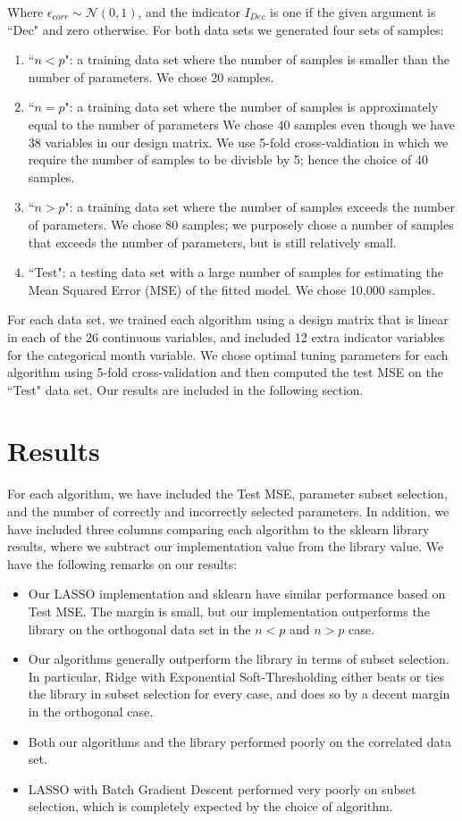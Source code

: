 \documentclass[11pt]{article}
\begin{document}
Where $\epsilon_{corr} \sim \mathcal{N}(0,1)$, and the indicator $I_{Dec}$ is one if the given argument is ``Dec" and zero otherwise.  For both data sets we generated four sets of samples:
\begin{enumerate}
	\item ``$n<p$": a training data set where the number of samples is smaller than the number of parameters.  We chose 20 samples.  
	\item ``$n=p$": a training data set where the number of samples is approximately equal to the number of parameters  We chose 40 samples even though we have 38 variables in our design matrix.  We use 5-fold cross-valdiation in which we require the number of samples to be divisble by 5; hence the choice of 40 samples.  
	\item ``$n>p$": a training data set where the number of samples exceeds the number of parameters.  We chose 80 samples; we purposely chose a number of samples that exceeds the number of parameters, but is still relatively small.  
	\item ``Test": a testing data set with a large number of samples for estimating the Mean Squared Error (MSE) of the fitted model.  We chose 10,000 samples.  
\end{enumerate}

For each data set, we trained each algorithm using a design matrix that is linear in each of the 26 continuous variables, and included 12 extra indicator variables for the categorical month variable.  We chose optimal tuning parameters for each algorithm using 5-fold cross-validation and then computed the test MSE on the ``Test" data set.  Our results are included in the following section.  


\section{Results}
For each algorithm, we have included the Test MSE, parameter subset selection, and the number of correctly and incorrectly selected parameters.  In addition, we have included three columns comparing each algorithm to the sklearn library results, where we subtract our implementation value from the library value.  We have the following remarks on our results:
\begin{itemize}
	\item Our LASSO implementation and sklearn have similar performance based on Test MSE.  The margin is small, but our implementation outperforms the library on the orthogonal data set in the $n<p$ and $n>p$ case.  
	\item Our algorithms generally outperform the library in terms of subset selection.  In particular, Ridge with Exponential Soft-Thresholding either beats or ties the library in subset selection for every case, and does so by a decent margin in the orthogonal case.  
	\item Both our algorithms and the library performed poorly on the correlated data set.  
	\item LASSO with Batch Gradient Descent performed very poorly on subset selection, which is completely expected by the choice of algorithm.  
\end{itemize}
\end{document}
